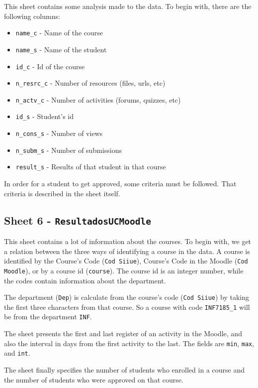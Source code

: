 This sheet contains some analysis made to the data. To begin with, there are
the following columns:

\begin{itemize}
    \item \texttt{name\_c} - Name of the course
    \item \texttt{name\_s} - Name of the student
    \item \texttt{id\_c} - Id of the course
    \item \texttt{n\_resrc\_c} - Number of resources (files, urls, etc)
    \item \texttt{n\_actv\_c} - Number of activities (forums, quizzes, etc)
    \item \texttt{id\_s} - Student's id
    \item \texttt{n\_cons\_s} - Number of views
    \item \texttt{n\_subm\_s} - Number of submissions
    \item \texttt{result\_s} - Results of that student in that course
\end{itemize}

In order for a student to get approved, some criteria must be followed. That
criteria is described in the sheet itself.

\subsection{Sheet 6 - \texttt{ResultadosUCMoodle}}

This sheet contains a lot of information about the courses. To begin with, we
get a relation between the three ways of identifying a course in the data. A
course is identified by the Course's Code (\texttt{Cod Siiue}), Course's Code
in the Moodle (\texttt{Cod Moodle}), or by a course id (\texttt{course}). The
course id is an integer number, while the codes contain information about the
department.

The department (\texttt{Dep}) is calculate from the course's code (\texttt{Cod
Siiue}) by taking the first three characters from that course. So a course with
code \texttt{INF7185\_1} will be from the department \texttt{INF}.

The sheet presents the first and last register of an activity in the Moodle,
and also the interval in days from the first activity to the last. The fields
are \texttt{min}, \texttt{max}, and \texttt{int}.

The sheet finally specifies the number of students who enrolled in a course and
the number of students who were approved on that course.

